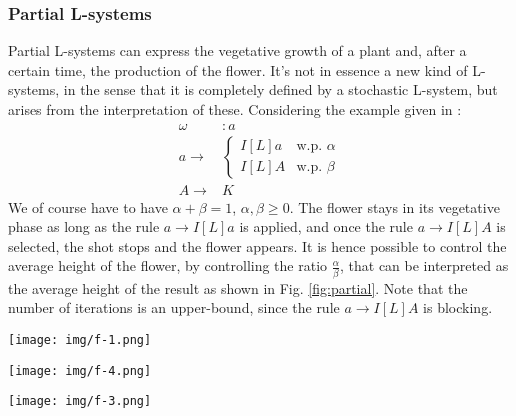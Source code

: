 \documentclass[10pt, letterpaper, twoside]{article}
\newenvironment{Figure}
  {\par\medskip\noindent\minipage{\linewidth}}
  {\endminipage\par\medskip}
\begin{document}
\begin{multicols}{2}
\subsubsection*{Partial L-systems}
Partial L-systems can express the vegetative growth of a plant and, after a
certain time, the production of the flower. It's not in essence a new kind of
L-systems, in the sense that it is completely defined by a stochastic L-system,
but arises from the interpretation of these. Considering the example given in
\cite{TheAB} :
\begin{equation}
    \label{eq:partial}
    \begin{aligned}
        \omega & : a \\
        a \rightarrow &
        \begin{cases}
            I [L] a & \text{w.p. } \alpha\\
            I [L] A & \text{w.p. } \beta
        \end{cases} \\
        A \rightarrow & K
    \end{aligned}
\end{equation}
We of course have to have $\alpha + \beta = 1$, $\alpha, \beta \geq 0$. The
flower stays in its vegetative phase as long as the rule $a\rightarrow I[L]a$ is
applied, and once the rule $a\rightarrow I[L]A$ is selected, the shot stops and
the flower appears. It is hence possible to control the average height of the
flower, by controlling the ratio $\frac{\alpha}{\beta}$, that can be interpreted
as the average height of the result as shown in Fig. \ref{fig:partial}. Note
that the number of iterations is an upper-bound, since the rule $a\rightarrow
I[L]A$ is blocking.

\begin{Figure}
    \centering
    \begin{minipage}{.3\textwidth}
      \centering
      \texttt{[image: img/f-1.png]}
    \end{minipage}%
    \begin{minipage}{.3\textwidth}
      \centering
      \texttt{[image: img/f-4.png]}
    \end{minipage}%
    \begin{minipage}{.3\textwidth}
        \centering
        \texttt{[image: img/f-3.png]}
    \end{minipage}
    \label{fig:partial}
\end{Figure}


\end{multicols}
\end{document}
